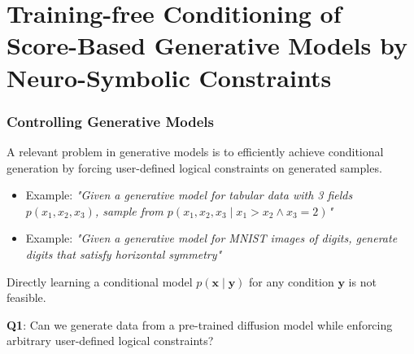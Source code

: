 \section{Training-free Conditioning of Score-Based Generative Models by Neuro-Symbolic Constraints}

\begin{frame}

\frametitle{Controlling Generative Models}

    A relevant problem in generative models is to efficiently achieve conditional generation by forcing user-defined logical constraints on generated samples.

    \begin{itemize}
        \item Example: \textit{"Given a generative model for tabular data with 3 fields $p(x_1,x_2,x_3)$, sample from $p(x_1, x_2, x_3 \mid x_1>x_2 \land x_3 = 2)$"}
        \item Example: \textit{"Given a generative model for MNIST images of digits, generate digits that satisfy horizontal symmetry"}
    \end{itemize}

    Directly learning a conditional model $p(\mathbf{x} \mid \mathbf{y})$ for any condition $\mathbf{y}$ is not feasible.


    \textbf{Q1}: Can we generate data from a pre-trained diffusion model while enforcing arbitrary
    user-defined logical constraints?
            
\end{frame}







